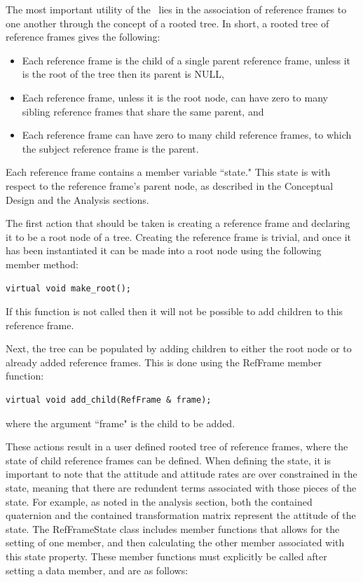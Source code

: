 The most important utility of the \ lies in the association
of reference frames to one another through the concept of a rooted tree.
In short, a rooted tree of reference frames gives the following:

\begin{itemize}
\item{Each reference frame is the child of a single parent reference frame, unless
it is the root of the tree then its parent is NULL},
\item{Each reference frame, unless it is the root node, can have zero to many
sibling reference frames that share the same parent}, and
\item{Each reference frame can have zero to many child reference frames, to which
the subject reference frame is the parent}.
\end{itemize}

Each reference frame contains a member variable ``state." This state is with
respect to the reference frame's parent node, as described in the
Conceptual Design and the Analysis sections.

The first action that should be taken is creating a reference frame and
declaring it to be a root node of a tree. Creating the reference frame is
trivial, and once it has been instantiated it can be made into
a root node using the following member method:

\begin{verbatim}
virtual void make_root();
\end{verbatim}

If this function is not called then it will not be possible to add children
to this reference frame.

Next, the tree can be populated by adding children to either the root node
or to already added reference frames. This is done using the RefFrame member
function:

\begin{verbatim}
virtual void add_child(RefFrame & frame);
\end{verbatim}

where the argument ``frame" is the child to be added.

These actions result in a user
defined rooted tree of reference frames, where the state of child reference
frames can be defined. When defining the state, it is important to note
that the attitude and attitude rates are over constrained in the state, meaning
that there are redundent terms associated with those pieces of the state.
For example, as noted in the analysis section, both the contained
quaternion and the contained transformation matrix represent the attitude
of the state. The RefFrameState class includes member functions that allows
for the setting of one member, and then calculating the other member
associated with this state property. These member functions must explicitly
be called after setting a data member, and are as follows:

